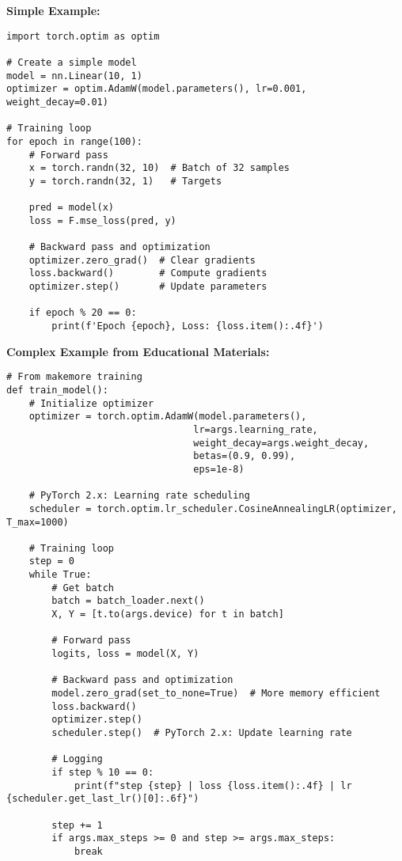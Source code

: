 \documentclass[11pt,a4paper]{book}
\begin{document}
\textbf{Simple Example:}
\begin{verbatim}
import torch.optim as optim

# Create a simple model
model = nn.Linear(10, 1)
optimizer = optim.AdamW(model.parameters(), lr=0.001, weight_decay=0.01)

# Training loop
for epoch in range(100):
    # Forward pass
    x = torch.randn(32, 10)  # Batch of 32 samples
    y = torch.randn(32, 1)   # Targets
    
    pred = model(x)
    loss = F.mse_loss(pred, y)
    
    # Backward pass and optimization
    optimizer.zero_grad()  # Clear gradients
    loss.backward()        # Compute gradients
    optimizer.step()       # Update parameters
    
    if epoch % 20 == 0:
        print(f'Epoch {epoch}, Loss: {loss.item():.4f}')
\end{verbatim}

\textbf{Complex Example from Educational Materials:}
\begin{verbatim}
# From makemore training
def train_model():
    # Initialize optimizer
    optimizer = torch.optim.AdamW(model.parameters(), 
                                 lr=args.learning_rate, 
                                 weight_decay=args.weight_decay, 
                                 betas=(0.9, 0.99), 
                                 eps=1e-8)
    
    # PyTorch 2.x: Learning rate scheduling
    scheduler = torch.optim.lr_scheduler.CosineAnnealingLR(optimizer, T_max=1000)
    
    # Training loop
    step = 0
    while True:
        # Get batch
        batch = batch_loader.next()
        X, Y = [t.to(args.device) for t in batch]
        
        # Forward pass
        logits, loss = model(X, Y)
        
        # Backward pass and optimization
        model.zero_grad(set_to_none=True)  # More memory efficient
        loss.backward()
        optimizer.step()
        scheduler.step()  # PyTorch 2.x: Update learning rate
        
        # Logging
        if step % 10 == 0:
            print(f"step {step} | loss {loss.item():.4f} | lr {scheduler.get_last_lr()[0]:.6f}")
        
        step += 1
        if args.max_steps >= 0 and step >= args.max_steps:
            break
\end{verbatim}
\end{document}
